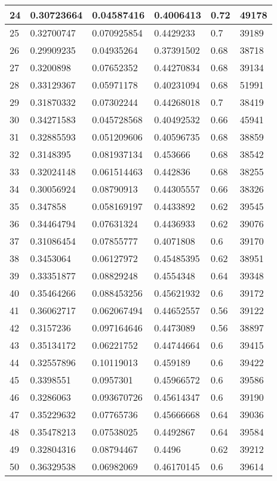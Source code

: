 \begin{longtable}{|l|l|l|l|l|l|}
24 & 0.30723664 & 0.04587416 & 0.4006413 & 0.72 & 49178 \\ \hline 
25 & 0.32700747 & 0.070925854 & 0.4429233 & 0.7 & 39189 \\ \hline 
26 & 0.29909235 & 0.04935264 & 0.37391502 & 0.68 & 38718 \\ \hline 
27 & 0.3200898 & 0.07652352 & 0.44270834 & 0.68 & 39134 \\ \hline 
28 & 0.33129367 & 0.05971178 & 0.40231094 & 0.68 & 51991 \\ \hline 
29 & 0.31870332 & 0.07302244 & 0.44268018 & 0.7 & 38419 \\ \hline 
30 & 0.34271583 & 0.045728568 & 0.40492532 & 0.66 & 45941 \\ \hline 
31 & 0.32885593 & 0.051209606 & 0.40596735 & 0.68 & 38859 \\ \hline 
32 & 0.3148395 & 0.081937134 & 0.453666 & 0.68 & 38542 \\ \hline 
33 & 0.32024148 & 0.061514463 & 0.442836 & 0.68 & 38255 \\ \hline 
34 & 0.30056924 & 0.08790913 & 0.44305557 & 0.66 & 38326 \\ \hline 
35 & 0.347858 & 0.058169197 & 0.4433892 & 0.62 & 39545 \\ \hline 
36 & 0.34464794 & 0.07631324 & 0.4436933 & 0.62 & 39076 \\ \hline 
37 & 0.31086454 & 0.07855777 & 0.4071808 & 0.6 & 39170 \\ \hline 
38 & 0.3453064 & 0.06127972 & 0.45485395 & 0.62 & 38951 \\ \hline 
39 & 0.33351877 & 0.08829248 & 0.4554348 & 0.64 & 39348 \\ \hline 
40 & 0.35464266 & 0.088453256 & 0.45621932 & 0.6 & 39172 \\ \hline 
41 & 0.36062717 & 0.062067494 & 0.44652557 & 0.56 & 39122 \\ \hline 
42 & 0.3157236 & 0.097164646 & 0.4473089 & 0.56 & 38897 \\ \hline 
43 & 0.35134172 & 0.06221752 & 0.44744664 & 0.6 & 39415 \\ \hline 
44 & 0.32557896 & 0.10119013 & 0.459189 & 0.6 & 39422 \\ \hline 
45 & 0.3398551 & 0.0957301 & 0.45966572 & 0.6 & 39586 \\ \hline 
46 & 0.3286063 & 0.093670726 & 0.45614347 & 0.6 & 39190 \\ \hline 
47 & 0.35229632 & 0.07765736 & 0.45666668 & 0.64 & 39036 \\ \hline 
48 & 0.35478213 & 0.07538025 & 0.4492867 & 0.64 & 39584 \\ \hline 
49 & 0.32804316 & 0.08794467 & 0.4496 & 0.62 & 39212 \\ \hline 
50 & 0.36329538 & 0.06982069 & 0.46170145 & 0.6 & 39614 \\ \hline 
\end{longtable}
